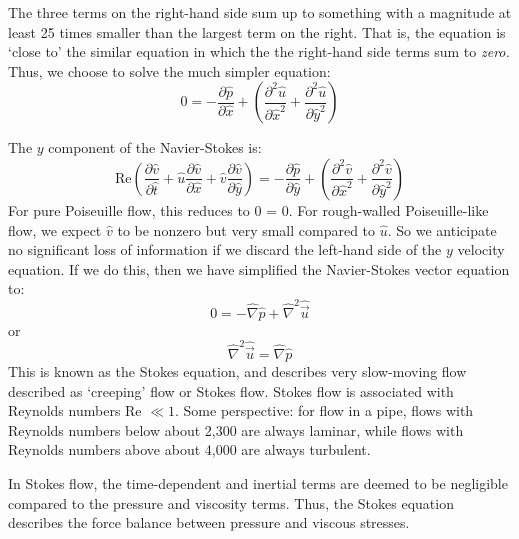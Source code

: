 \documentclass[12pt, a4paper, twoside, openright]{book}
\begin{document}
The three terms on the right-hand side sum up to something with a magnitude at least 25 times smaller than the largest term on the right.
That is, the equation is `close to' the similar equation in which the the right-hand side terms sum to \emph{zero.}  Thus, we choose to solve the much simpler equation: 
\begin{equation}
0 = -  \frac{\partial \hat{p}}{\partial \hat{x}} + 
\left( \frac{\partial^2 \hat{u}}{\partial \hat{x}^2} + 
\frac{\partial^2 \hat{u}}{\partial \hat{y}^2} \right)
\end{equation}

The $y$ component of the Navier-Stokes is:
\begin{equation}
\mathrm{Re} \left( 
\frac{\partial \hat{v}}{\partial \hat{t}} +
\hat{u} \frac{\partial \hat{v}}{\partial \hat{x}} +
\hat{v} \frac{\partial \hat{v}}{\partial \hat{y}}
 \right) =
    -  \frac{\partial \hat{p}}{\partial \hat{y}} + 
\left( \frac{\partial^2 \hat{v}}{\partial \hat{x}^2} + 
       \frac{\partial^2 \hat{v}}{\partial \hat{y}^2} 
\right)
\end{equation}
For pure Poiseuille flow, this reduces to 0 = 0.  For rough-walled Poiseuille-like flow, we expect $\hat{v}$ to be nonzero but very small compared to $\hat{u}$.  
So we anticipate no significant loss of information if we discard the left-hand side of the $y$ velocity equation.  If we do this, then we have simplified the Navier-Stokes vector equation to:
\begin{equation}
0 = -\hat{\nabla} \hat{p} + \hat{\nabla}^2 \hat{\vec{u}}
\end{equation}
or
\begin{equation}
\hat{\nabla}^2 \hat{\vec{u}} = \hat{\nabla} \hat{p}
\end{equation}
This is known as the Stokes equation, and describes very slow-moving flow described as `creeping' flow or Stokes flow.  Stokes flow is associated with Reynolds numbers Re $ \ll 1$.  Some perspective: for flow in a pipe, flows with Reynolds numbers below about 2,300 are always laminar, while flows with Reynolds numbers above about 4,000 are always turbulent.

In Stokes flow, the time-dependent and inertial terms are deemed to be negligible compared to the pressure and viscosity terms.  Thus, the Stokes equation describes the force balance between pressure and viscous stresses.
\end{document}
